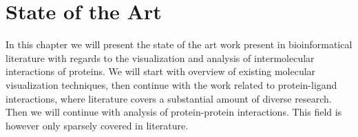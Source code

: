 \chapter{State of the Art}
\label{Sec:star}
In this chapter we will present the state of the art work present in bioinformatical literature with regards to the visualization and analysis of intermolecular interactions of proteins. We will start with overview of existing molecular visualization techniques, then continue with the work related to protein-ligand interactions, where literature covers a substantial amount of diverse research. Then we will continue with analysis of protein-protein interactions. This field is however only sparsely covered in literature.

